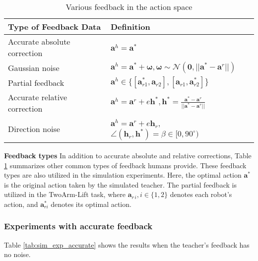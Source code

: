 \begin{table}[t!]
\caption{Various feedback in the action space}
\centering
\begin{tabularx}{0.49\textwidth}{@{}lX@{}}
\toprule
\textbf{Type of Feedback Data}      & \textbf{Definition} \\ \midrule
Accurate absolute correction              & \( \bm a^h = \bm a^* \) \\
Gaussian noise             & \( \bm a^h = \bm a^* + \bm \omega, \bm \omega \sim \mathcal{N}(\bm0, ||\bm a^* - \bm a^r||) \) \\
Partial feedback           & \( \bm a^h \in \{[\bm a^*_{r1}, \bm a_{r2}], [\bm a_{r1}, \bm a_{r2}^*]\} \) \\ 
\hline
Accurate relative correction              & \(\bm  a^h = \bm a^r + e\bm h^*, \bm h^*= \frac{\bm a^* - \bm a^r}{||\bm a^* - \bm a^r||}  \) \\
Direction noise            & \( \bm a^h = \bm a^r + e \bm h_r \), \( \angle (\bm h_r, \bm h^*) = \beta \in [0, 90^\circ) \) \\
\bottomrule
\end{tabularx}
\label{tab:feedback-definitions}
\end{table}
\textbf{Feedback types}
In addition to accurate absolute and relative corrections, Table \ref{tab:feedback-definitions} summarizes other common types of feedback humans provide. These feedback types are also utilized in the simulation experiments. Here, the optimal action $\bm a^*$ is the original action taken by the simulated teacher. The partial feedback is utilized in the TwoArm-Lift task, where $\bm a_{r\,i}, i\in\{1, 2\}$ denotes each robot's action, and $\bm a_{ri}^*$ denotes its optimal action. 



\subsubsection{Experiments with accurate feedback}
\label{sec:exp:accurate_feedback}

Table \ref{tab:sim_exp_accurate} shows the results when the teacher's feedback has no noise. 

